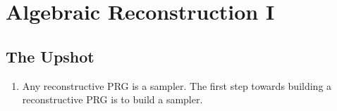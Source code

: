 \chapter{Algebraic Reconstruction I}

\section*{The Upshot}

\begin{enumerate}
  \item Any reconstructive PRG is a sampler. The first step towards building a
    reconstructive PRG is to build a sampler.
\end{enumerate}
